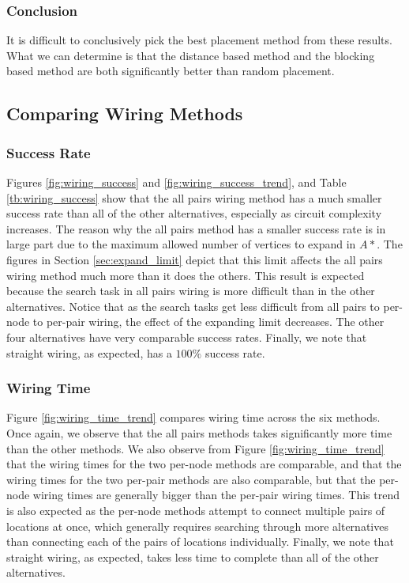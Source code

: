 \subsubsection{Conclusion}
It is difficult to conclusively pick the best placement method from these
results. What we can determine is that the distance based method and the
blocking based method are both significantly better than random placement.

\subsection{Comparing Wiring Methods}

\subsubsection{Success Rate}
Figures \ref{fig:wiring_success} and \ref{fig:wiring_success_trend}, and Table
\ref{tb:wiring_success} show that the all pairs wiring method has a much smaller
success rate than all of
the other alternatives, especially as circuit complexity increases. The reason
why the all pairs method has a smaller success rate is in
large part due to the maximum allowed number of vertices to expand in $A*$. The
figures in Section \ref{sec:expand_limit} depict that this limit affects
the all pairs wiring method much more than it does the others. This result is
expected because the search task in all pairs wiring is more difficult than in
the other alternatives. Notice that as the search tasks get less difficult from
all pairs to per-node to per-pair wiring, the effect of the expanding limit
decreases. The other four alternatives have very comparable success rates.
Finally, we note that straight wiring, as expected, has a $100\%$ success rate.

\subsubsection{Wiring Time}
Figure \ref{fig:wiring_time_trend} compares wiring time across
the six methods. Once again, we observe that the all pairs methods takes
significantly more time than the other methods. We also observe from Figure
\ref{fig:wiring_time_trend} that the wiring times for the two per-node methods
are comparable, and that the wiring times for the two per-pair methods are also
comparable, but that the per-node wiring times are generally bigger than the
per-pair wiring times. This trend is also expected as the per-node methods
attempt to connect multiple pairs of locations at once, which generally requires
searching through more alternatives than
connecting each of the pairs of locations individually.
Finally, we note that straight wiring, as expected, takes less time to complete
than all of the other alternatives.


